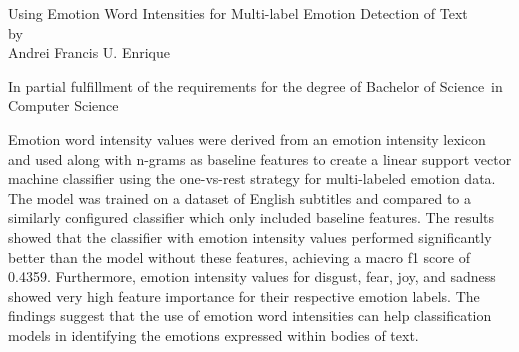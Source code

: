 \documentclass{icsthesis}
\renewcommand{\TITLE}{Using Emotion Word Intensities for Multi-label Emotion Detection of Text}
\renewcommand{\AUTHOR}{Andrei Francis U. Enrique}
\renewcommand{\DEGREE}{Bachelor of Science}
\renewcommand{\MAJOR}{Computer Science}
\begin{document}
	
	\begin{frontmatter}
		\maketitle
				
		\begin{approvalpage}
            \centering
            \TITLE\\
            \vspace*{.65in}
            by\\
            \vspace*{.65in}
            \AUTHOR\\
            \vspace*{.65in}
			
			In partial fulfillment of the requirements for the degree of \DEGREE\ in \MAJOR
            \vspace*{.65in}
		\end{approvalpage}
		
			
			
		

	
		
		\begin{abstractwithpageno}	
			Emotion word intensity values were derived from an emotion intensity lexicon and used along with n-grams as baseline features to create a linear support vector machine classifier using the one-vs-rest strategy for multi-labeled emotion data. The model was trained on a dataset of English subtitles and compared to a similarly configured classifier which only included baseline features. The results showed that the classifier with emotion intensity values performed significantly better than the model without these features, achieving a macro f1 score of 0.4359. Furthermore, emotion intensity values for disgust, fear, joy, and sadness showed very high feature importance for their respective emotion labels. The findings suggest that the use of emotion word intensities can help classification models in identifying the emotions expressed within bodies of text.
		\end{abstractwithpageno}
  

\end{frontmatter}
\end{document}
